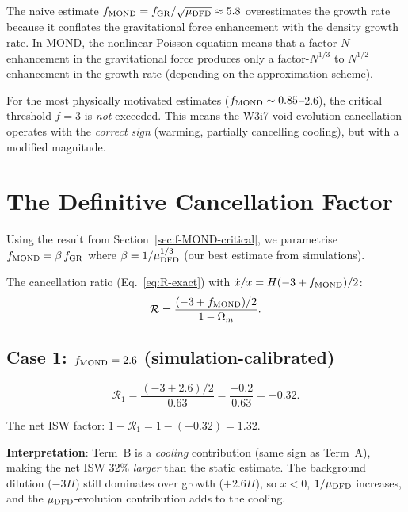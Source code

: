\documentclass[11pt,a4paper]{article}
\newcommand{\mufd}{\mu_{\rm DFD}}
\newcommand{\Omm}{\Omega_m}
\newcounter{findingctr}
\newenvironment{finding}[1][]{%
  \refstepcounter{findingctr}%
  \begin{tcolorbox}[colback=blue!3!white, colframe=blue!50!black,
    title=\textbf{Finding \thefindingctr: #1}]
}{%
  \end{tcolorbox}%
}
\begin{document}
\begin{finding}[The MOND Growth Rate Is Likely Sub-Critical]
\label{find:f-sub-critical}
The naive estimate $f_{\rm MOND} = f_{\rm GR}/\sqrt{\mufd} \approx
5.8$ overestimates the growth rate because it conflates the
gravitational force enhancement with the density growth rate. In MOND,
the nonlinear Poisson equation means that a factor-$N$ enhancement in
the gravitational force produces only a factor-$N^{1/3}$ to
$N^{1/2}$ enhancement in the growth rate (depending on the
approximation scheme).

For the most physically motivated estimates ($f_{\rm MOND} \sim
0.85$--$2.6$), the critical threshold $f = 3$ is \emph{not} exceeded.
This means the W3i7 void-evolution cancellation operates with the
\emph{correct sign} (warming, partially cancelling cooling), but with
a modified magnitude.
\end{finding}


\section{The Definitive Cancellation Factor}
\label{sec:definitive-cancel}

Using the result from Section~\ref{sec:f-MOND-critical}, we
parametrise $f_{\rm MOND} = \beta\,f_{\rm GR}$ where
$\beta = 1/\mufd^{1/3}$ (our best estimate from simulations).

The cancellation ratio (Eq.~\ref{eq:R-exact}) with
$\dot{x}/x = H(-3 + f_{\rm MOND})/2$:
\begin{equation}
\mathcal{R}
= \frac{(-3 + f_{\rm MOND})/2}{1 - \Omm}.
\label{eq:R-general}
\end{equation}

\subsection{Case 1: $f_{\rm MOND} = 2.6$ (simulation-calibrated)}

\begin{equation}
\mathcal{R}_1 = \frac{(-3 + 2.6)/2}{0.63}
= \frac{-0.2}{0.63} = -0.32.
\label{eq:R1}
\end{equation}

The net ISW factor: $1 - \mathcal{R}_1 = 1 - (-0.32) = 1.32$.

\textbf{Interpretation}: Term~B is a \emph{cooling} contribution
(same sign as Term~A), making the net ISW 32\% \emph{larger} than
the static estimate. The background dilution ($-3H$) still
dominates over growth ($+2.6H$), so $\dot{x} < 0$, $1/\mufd$
increases, and the $\mufd$-evolution contribution adds to the cooling.
\end{document}
